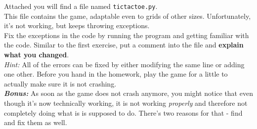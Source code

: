 \noindent Attached you will find a file named \texttt{tictactoe.py}.\\
This file contains the game, adaptable even to grids of other sizes.
Unfortunately, it's not working, but keeps throwing exceptions.\\
Fix the exceptions in the code by running the program and getting familiar
with the code. Similar to the first exercise, put a comment into the file
and \textbf{explain what you changed}.\\

\noindent\textit{Hint:} All of the errors can be fixed by either modifying the same
line or adding one other. Before you hand in the homework, play the game
for a little to actually make sure it is not crashing.\\
\textbf{\textit{Bonus:}} As soon as the game does not crash anymore, you might
notice that even though it's now technically working, it is not working
\textit{properly} and therefore not completely doing what is is supposed to
do. There's two reasons for that - find and fix them as well.



